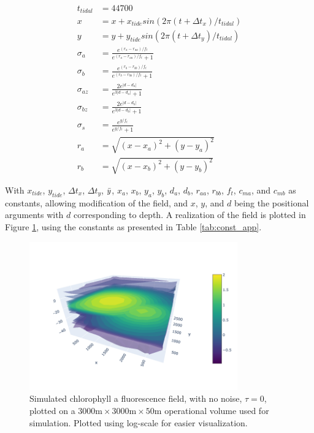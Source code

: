 \begin{align}
    t_{tidal} &= 44700 \\
    x &= x + x_{tide}sin(2\pi (t + \Delta t_{x}) /t_{tidal})\\
    y &= y + y_{tide}sin(2\pi (t+ \Delta t_{y}) /t_{tidal})\\
    \sigma_a &= \frac{e^{(r_a-r_{aa})/f_t}}{e^{(r_a-r_{aa})/f_t}+1}\\
    \sigma_b &= \frac{e^{(r_b-r_{bb})/f_t}}{e^{(r_b-r_{bb})/f_t}+1}\\
    \sigma_{az} &= \frac{2e^{|d-d_a|}}{e^{3|d-d_a|}+1} \\
    \sigma_{bz} &= \frac{2e^{|d-d_b|}}{e^{3|d-d_b|}+1} \\ 
    \sigma_s &= \frac{e^{y/f_t}}{e^{y/f_t}+1}\\
    r_a &= \sqrt{(x-x_a)^2+(y-y_a)^2}\\
    r_b &= \sqrt{(x-x_b)^2+(y-y_b)^2}
\end{align}

With $x_{tide}$, $y_{tide}$, $\Delta t_{x}$, $\Delta t_{y}$, $\Bar{y}$, $x_a$, $x_b$, $y_a$, $y_b$, $d_a$, $d_b$, $r_{aa}$, $r_{bb}$, $f_t$, $c_{ma}$, and $c_{mb}$ as constants, allowing modification of the field, and $x$, $y$, and $d$ being the positional arguments with $d$ corresponding to depth. A realization of the field is plotted in Figure \ref{fig:appdx1}, using the constants as presented in Table \ref{tab:const_app}. 


\begin{figure}
    \centering
    \includegraphics[width=0.8\textwidth]{figures/fig_gp_temp4.png}
    \caption{Simulated chlorophyll a fluorescence field, with no noise, $\tau = 0$, plotted on a $3000\text{m}\times3000\text{m}\times50$m operational volume used for simulation. Plotted using log-scale for easier visualization. }
    \label{fig:appdx1}
\end{figure}

